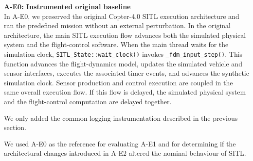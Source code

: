 \noindent \textbf{A-E0: Instrumented original baseline} \\
\noindent In A-E0, we preserved the original Copter-4.0 SITL execution architecture and ran the predefined mission without an external perturbation. In the original architecture, the main SITL execution flow advances both the simulated physical system and the flight-control software. When the main thread waits for the simulation clock,
\texttt{SITL\_State::wait\_clock()} invokes \texttt{\_fdm\_input\_step()}. This function advances the flight-dynamics model, updates the simulated vehicle and sensor interfaces, executes the associated timer events, and advances the synthetic simulation clock. Sensor production and control execution are coupled in the same overall execution flow. If this flow is delayed, the simulated physical system and the flight-control computation are delayed together.

\noindent We only added the common logging instrumentation described in the previous section. 

\noindent We used A-E0 as the reference for evaluating A-E1 and for determining if the architectural changes introduced in A-E2 altered the nominal behaviour of SITL.

